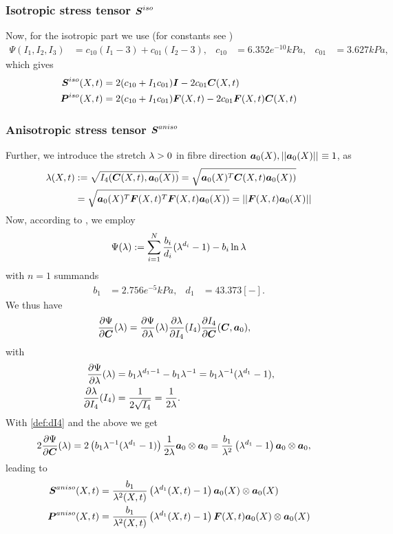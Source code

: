 \subsubsection{Isotropic stress tensor $\boldsymbol{S}^{iso}$}
Now, for the isotropic part we use (for constants see \cite{Zheng1999})
\begin{align*}
	\Psi(I_1,I_2,I_3) &= c_{10}(I_1-3) + c_{01}(I_2-3), & c_{10} &= 6.352e^{-10}kPa, & c_{01} &= 3.627kPa, 
\end{align*}
which gives
\begin{align}
	\boldsymbol{S}^{iso}(X,t) &= 2(c_{10} + I_1c_{01})\boldsymbol{I} - 2c_{01}\boldsymbol{C}(X,t)\\
	\boldsymbol{P}^{iso}(X,t) &= 2(c_{10} + I_1c_{01})\boldsymbol{F}(X,t) - 2c_{01}\boldsymbol{F}(X,t)\boldsymbol{C}(X,t)
\end{align}

\subsubsection{Anisotropic stress tensor $\boldsymbol{S}^{aniso}$}
Further, we introduce the stretch $\lambda > 0$ in fibre direction $\boldsymbol{a}_0(X), \left|\left|\boldsymbol{a}_0(X)\right|\right|_{} \equiv 1$, as
\begin{align*}
	\lambda(X,t) &:= \sqrt{I_4(\boldsymbol{C}(X,t),\boldsymbol{a}_0(X))} = \sqrt{\boldsymbol{a}_0(X)^T\boldsymbol{C}(X,t)\boldsymbol{a}_0(X))}\\
	&= \sqrt{\boldsymbol{a}_0(X)^T\boldsymbol{F}(X,t)^T\boldsymbol{F}(X,t)\boldsymbol{a}_0(X))} = \left|\left|\boldsymbol{F}(X,t)\boldsymbol{a}_0(X)\right|\right|_{}
\end{align*}
Now, according to \cite{Markert2005}, we employ
\begin{align*}
	\Psi(\lambda) := \sum\limits_{i=1}^{N} \frac{b_i}{d_i}(\lambda^{d_i} - 1) - b_i\ln\lambda
\end{align*}
with $n=1$ summands 
\begin{align*}
	b_1 &= 2.756e^{-5}kPa, & d_1 &= 43.373 [-].
\end{align*}
We thus have
\begin{align}
	\frac{\partial \Psi}{\partial \boldsymbol{C}}(\lambda) &= \frac{\partial \Psi}{\partial \lambda}(\lambda)\frac{\partial \lambda}{\partial I_4}(I_4)\frac{\partial I_4}{\partial \boldsymbol{C}}(\boldsymbol{C},\boldsymbol{a}_0),\label{eq:dpsidC}
\end{align}
with
\begin{align*}
		 \frac{\partial \Psi}{\partial \lambda}(\lambda) &= b_1\lambda^{d_1-1} - b_1\lambda^{-1} = b_1\lambda^{-1}(\lambda^{d_1} - 1),\\
		 \frac{\partial \lambda}{\partial I_4}(I_4) &= \frac{1}{2\sqrt{I_4}} = \frac{1}{2\lambda}.
\end{align*}
With \eqref{def:dI4} and the above we get
\begin{align*}
	2\frac{\partial \Psi}{\partial \boldsymbol{C}}(\lambda) &= 2\left(b_1\lambda^{-1}(\lambda^{d_1} - 1)\right) \frac{1}{2\lambda}\boldsymbol{a}_0\otimes\boldsymbol{a}_0
	= \frac{b_1}{\lambda^2}\left(\lambda^{d_1} - 1\right) \boldsymbol{a}_0\otimes\boldsymbol{a}_0,
\end{align*}
leading to
\begin{align}
	\boldsymbol{S}^{aniso}(X,t) &= \frac{b_1}{\lambda^2(X,t)}\left(\lambda^{d_1}(X,t) - 1\right) \boldsymbol{a}_0(X)\otimes\boldsymbol{a}_0(X)\\
	\boldsymbol{P}^{aniso}(X,t) &= \frac{b_1}{\lambda^2(X,t)}\left(\lambda^{d_1}(X,t) - 1\right) \boldsymbol{F}(X,t)\boldsymbol{a}_0(X)\otimes\boldsymbol{a}_0(X)
\end{align}

